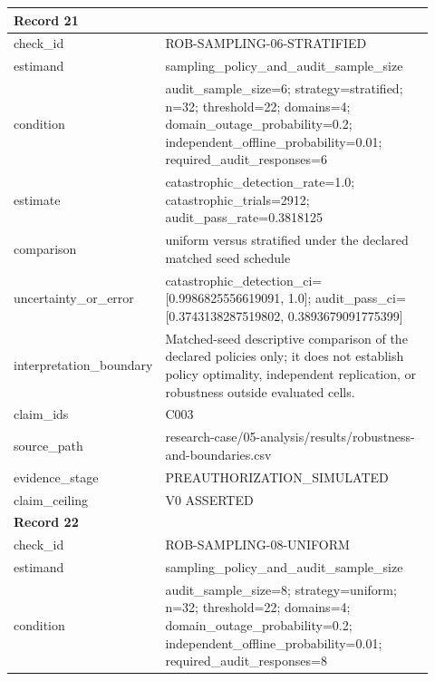 \begin{longtable}{|p{0.24\linewidth}|p{0.68\linewidth}|}
\multicolumn{2}{|l|}{\textbf{Record 21}} \\ \hline
check\_\allowbreak{}id & ROB-SAMPLING-06-STRATIFIED \\ \hline
estimand & sampling\_\allowbreak{}policy\_\allowbreak{}and\_\allowbreak{}audit\_\allowbreak{}sample\_\allowbreak{}size \\ \hline
condition & audit\_\allowbreak{}sample\_\allowbreak{}size=6;\allowbreak{} strategy=stratified;\allowbreak{} n=32;\allowbreak{} threshold=22;\allowbreak{} domains=4;\allowbreak{} domain\_\allowbreak{}outage\_\allowbreak{}probability=0.2;\allowbreak{} independent\_\allowbreak{}offline\_\allowbreak{}probability=0.01;\allowbreak{} required\_\allowbreak{}audit\_\allowbreak{}responses=6 \\ \hline
estimate & catastrophic\_\allowbreak{}detection\_\allowbreak{}rate=1.0;\allowbreak{} catastrophic\_\allowbreak{}trials=2912;\allowbreak{} audit\_\allowbreak{}pass\_\allowbreak{}rate=0.3818125 \\ \hline
comparison & uniform versus stratified under the declared matched seed schedule \\ \hline
uncertainty\_\allowbreak{}or\_\allowbreak{}error & catastrophic\_\allowbreak{}detection\_\allowbreak{}ci=[0.9986825556619091, 1.0];\allowbreak{} audit\_\allowbreak{}pass\_\allowbreak{}ci=[0.3743138287519802, 0.3893679091775399] \\ \hline
interpretation\_\allowbreak{}boundary & Matched-seed descriptive comparison of the declared policies only;\allowbreak{} it does not establish policy optimality, independent replication, or robustness outside evaluated cells. \\ \hline
claim\_\allowbreak{}ids & C003 \\ \hline
source\_\allowbreak{}path & research-case/05-analysis/results/robustness-and-boundaries.csv \\ \hline
evidence\_\allowbreak{}stage & PREAUTHORIZATION\_\allowbreak{}SIMULATED \\ \hline
claim\_\allowbreak{}ceiling & V0 ASSERTED \\ \hline
\multicolumn{2}{|l|}{\textbf{Record 22}} \\ \hline
check\_\allowbreak{}id & ROB-SAMPLING-08-UNIFORM \\ \hline
estimand & sampling\_\allowbreak{}policy\_\allowbreak{}and\_\allowbreak{}audit\_\allowbreak{}sample\_\allowbreak{}size \\ \hline
condition & audit\_\allowbreak{}sample\_\allowbreak{}size=8;\allowbreak{} strategy=uniform;\allowbreak{} n=32;\allowbreak{} threshold=22;\allowbreak{} domains=4;\allowbreak{} domain\_\allowbreak{}outage\_\allowbreak{}probability=0.2;\allowbreak{} independent\_\allowbreak{}offline\_\allowbreak{}probability=0.01;\allowbreak{} required\_\allowbreak{}audit\_\allowbreak{}responses=8 \\ \hline

\end{longtable}
